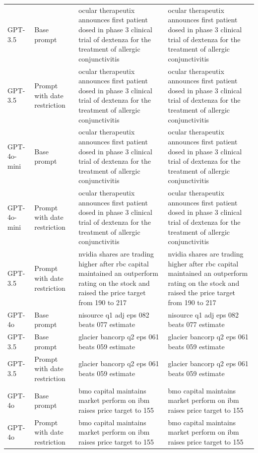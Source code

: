 \begin{longtable}{>{\raggedright\arraybackslash}p{1.4cm}>{\raggedright\arraybackslash}p{1.4cm}>{\raggedright\arraybackslash}p{5.5cm}>{\raggedright\arraybackslash}p{5.5cm}}
GPT-3.5 & Base prompt & ocular therapeutix announces first patient dosed in phase 3 clinical trial of dextenza for the treatment of allergic conjunctivitis & ocular therapeutix announces first patient dosed in phase 3 clinical trial of dextenza for the treatment of allergic conjunctivitis\\
GPT-3.5 & Prompt with date restriction & ocular therapeutix announces first patient dosed in phase 3 clinical trial of dextenza for the treatment of allergic conjunctivitis & ocular therapeutix announces first patient dosed in phase 3 clinical trial of dextenza for the treatment of allergic conjunctivitis\\
GPT-4o-mini & Base prompt & ocular therapeutix announces first patient dosed in phase 3 clinical trial of dextenza for the treatment of allergic conjunctivitis & ocular therapeutix announces first patient dosed in phase 3 clinical trial of dextenza for the treatment of allergic conjunctivitis\\
GPT-4o-mini & Prompt with date restriction & ocular therapeutix announces first patient dosed in phase 3 clinical trial of dextenza for the treatment of allergic conjunctivitis & ocular therapeutix announces first patient dosed in phase 3 clinical trial of dextenza for the treatment of allergic conjunctivitis\\
GPT-3.5 & Prompt with date restriction & nvidia shares are trading higher after rbc capital maintained an outperform rating on the stock and raised the price target from 190 to 217 & nvidia shares are trading higher after rbc capital maintained an outperform rating on the stock and raised the price target from 190 to 217\\
GPT-4o & Base prompt & nisource q1 adj eps 082 beats 077 estimate & nisource q1 adj eps 082 beats 077 estimate\\
GPT-3.5 & Base prompt & glacier bancorp q2 eps 061 beats 059 estimate & glacier bancorp q2 eps 061 beats 059 estimate\\
GPT-3.5 & Prompt with date restriction & glacier bancorp q2 eps 061 beats 059 estimate & glacier bancorp q2 eps 061 beats 059 estimate\\
GPT-4o & Base prompt & bmo capital maintains market perform on ibm raises price target to 155 & bmo capital maintains market perform on ibm raises price target to 155\\
GPT-4o & Prompt with date restriction & bmo capital maintains market perform on ibm raises price target to 155 & bmo capital maintains market perform on ibm raises price target to 155\\

\end{longtable}
